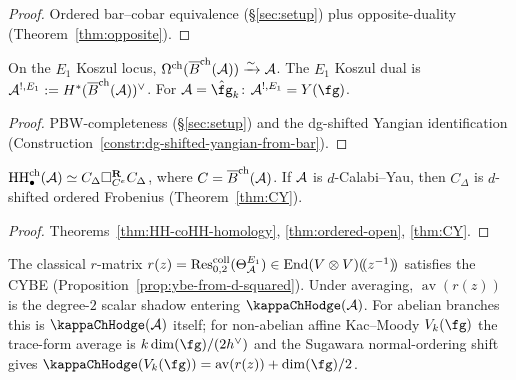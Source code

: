 \begin{proof}
Ordered bar--cobar equivalence (\S\ref{sec:setup}) plus
opposite-duality (Theorem~\ref{thm:opposite}).
\end{proof}

\begin{theorem}
On the $E_1$ Koszul locus,
$\Omega^{\mathrm{ch}}(\overline{B}^{\mathrm{ch}}(\mathcal{A})) \xrightarrow{\sim} \mathcal{A}$.
The $E_1$ Koszul dual is
$\mathcal{A}^{!,E_1} := H^*(\overline{B}^{\mathrm{ch}}(\mathcal{A}))^\vee$.
For $\cA = \hat\fg_k$:
$\cA^{!,E_1} = Y(\fg)$.
\end{theorem}

\begin{proof}
PBW-completeness (\S\ref{sec:setup}) and the dg-shifted Yangian
identification
(Construction~\ref{constr:dg-shifted-yangian-from-bar}).
\end{proof}

\begin{theorem}
$\operatorname{HH}^{\mathrm{ch}}_\bullet(\mathcal{A})
\simeq
C_\Delta \square_{C^e}^{\mathbf{R}} C_\Delta$,
where $C = \overline{B}^{\mathrm{ch}}(\mathcal{A})$.
If $\mathcal{A}$ is $d$-Calabi--Yau, then $C_\Delta$ is
$d$-shifted ordered Frobenius
\textup{(}Theorem~\textup{\ref{thm:CY}}).
\end{theorem}

\begin{proof}
Theorems~\ref{thm:HH-coHH-homology}, \ref{thm:ordered-open},
\ref{thm:CY}.
\end{proof}

\begin{theorem}
The classical $r$-matrix
$r(z) = \operatorname{Res}^{\mathrm{coll}}_{0,2}(\Theta_{\mathcal{A}}^{E_1})
\in \operatorname{End}(V \otimes V)(\!(z^{-1})\!)$
satisfies the CYBE
\textup{(}Proposition~\textup{\ref{prop:ybe-from-d-squared}}).
Under averaging, $\operatorname{av}(r(z))$ is the degree-$2$
scalar shadow entering $\kappaChHodge(\cA)$. For abelian branches this
is $\kappaChHodge(\cA)$ itself; for non-abelian affine
Kac--Moody $V_k(\fg)$ the trace-form average is
$k\dim(\fg)/(2h^\vee)$ and the Sugawara normal-ordering shift gives
$\kappaChHodge(V_k(\fg))=\operatorname{av}(r(z))+\dim(\fg)/2$.
\end{theorem}

